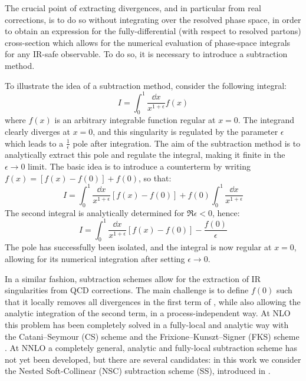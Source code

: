 The crucial point of extracting divergences, and in particular from real corrections, is to do so without integrating over the resolved phase space, in order to obtain an expression for the fully-differential (with respect to resolved partons) cross-section which allows for the numerical evaluation of phase-space integrals for any IR-safe observable. To do so, it is necessary to introduce a subtraction method.

To illustrate the idea of a subtraction method, consider the following integral:
\begin{equation}
  I = \int_0^1 \frac{\dd x}{x^{1 + \epsilon}} f(x)
\end{equation}
where $ f(x) $ is an arbitrary integrable function regular at $ x = 0 $. The integrand clearly diverges at $ x = 0 $, and this singularity is regulated by the parameter $ \epsilon $ which leads to a $ \frac{1}{\epsilon} $ pole after integration. The aim of the subtraction method is to analytically extract this pole and regulate the integral, making it finite in the $ \epsilon \rightarrow 0 $ limit. The basic idea is to introduce a counterterm by writing $ f(x) = [f(x) - f(0)] + f(0) $, so that:
\begin{equation*}
  I = \int_0^1 \frac{\dd x}{x^{1 + \epsilon}} \left[ f(x) - f(0) \right] + f(0) \int_0^1 \frac{\dd x}{x^{1 + \epsilon}}
\end{equation*}
The second integral is analytically determined for $ \Re{\epsilon} < 0 $, hence:
\begin{equation}
  I = \int_0^1 \frac{\dd x}{x^{1 + \epsilon}} \left[ f(x) - f(0) \right] - \frac{f(0)}{\epsilon}
  \label{eq:reg-i}
\end{equation}
The pole has successfully been isolated, and the integral is now regular at $ x = 0 $, allowing for its numerical integration after setting $ \epsilon \rightarrow 0 $.

In a similar fashion, subtraction schemes allow for the extraction of IR singularities from QCD corrections. The main challenge is to define $ f(0) $ such that it locally removes all divergences in the first term of , while also allowing the analytic integration of the second term, in a process-independent way. At NLO this problem has been completely solved in a fully-local and analytic way with the Catani--Seymour (CS) scheme \cite{Catani-1997} and the Frixione--Kunszt--Signer (FKS) scheme \cite{Frixione-1996, Frixione-1997}. At NNLO a completely general, analytic and fully-local subtraction scheme has not yet been developed, but there are several candidates: in this work we consider the Nested Soft-Collinear (NSC) subtraction scheme (SS), introduced in \cite{rontsch-2017}.

